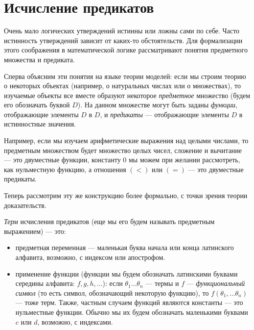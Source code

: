 \section{Исчисление предикатов}

Очень мало логических утверждений истинны или ложны сами по себе.
Часто истинность утверждений зависит от каких-то обстоятельств.
Для формализации этого соображения в математической логике рассматривают
понятия предметного множества и предиката.

Сперва объясним эти понятия на языке теории моделей:
если мы строим теорию о некоторых объектах (например, о натуральных 
числах или о множествах), то изучаемые объекты все вместе образуют 
некоторое \emph{предметное} множество (будем его обозначать буквой $D$). 
На данном множестве могут быть заданы \emph{функции}, отображающие элементы
$D$ в $D$, и \emph{предикаты} --- отображающие элементы $D$ в 
истинностные значения.

Например, если мы изучаем арифметические выражения над целыми числами, 
то предметным множеством будет множество целых чисел, сложение и
вычитание --- это двуместные функции, константу $0$ мы можем при желании
рассмотреть, как нульместную функцию, а отношения $(<)$ или $(=)$ ---
это двуместные предикаты.

Теперь рассмотрим эту же конструкцию более формально, с точки зрения теории 
доказательств.

\begin{definition}\emph{Терм} исчисления предикатов (еще мы его будем
называть предметным выражением) --- это:
\begin{itemize}
\item предметная переменная --- маленькая буква начала или конца латинского 
алфавита, возможно, с индексом или апострофом.
\item применение функции (функции мы будем обозначать латинскими 
буквами середины алфавита: $f, g, h, \dots$):
если $\theta_1 \dots \theta_n$ --- термы и $f$ --- 
\emph{функциональный символ} (то есть символ, обозначающий некоторую
функцию), то $f (\theta_1, \dots \theta_n)$ 
--- тоже терм. Также, частным случаем функций являются константы ---
это нульместные функции. Обычно мы их будем обозначать маленькими 
буквами $c$ или $d$, возможно, с индексами.
\end{itemize}
\end{definition}

